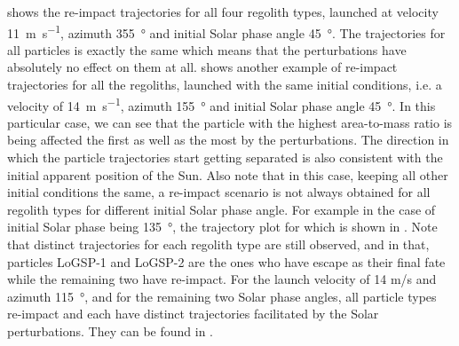  shows the re-impact trajectories for all four regolith types, launched at velocity \SI{11}{\metre\per\second}, azimuth \SI{355}{\degree} and initial Solar phase angle \SI{45}{\degree}. The trajectories for all particles is exactly the same which means that the perturbations have absolutely no effect on them at all.  shows another example of re-impact trajectories for all the regoliths, launched with the same initial conditions, i.e. a velocity of \SI{14}{\metre\per\second}, azimuth \SI{155}{\degree} and initial Solar phase angle \SI{45}{\degree}. In this particular case, we can see that the particle with the highest area-to-mass ratio is being affected the first as well as the most by the perturbations. The direction in which the particle trajectories start getting separated is also consistent with the initial apparent position of the Sun. Also note that in this case, keeping all other initial conditions the same, a re-impact scenario is not always obtained for all regolith types for different initial Solar phase angle. For example in the case of initial Solar phase being \SI{135}{\degree}, the trajectory plot for which is shown in . Note that distinct trajectories for each regolith type are still observed, and in that, particles LoGSP-1 and LoGSP-2 are the ones who have escape as their final fate while the remaining two have re-impact. For the launch velocity of 14 m/s and azimuth \SI{115}{\degree}, and for the remaining two Solar phase angles, all particle types re-impact and each have distinct trajectories facilitated by the Solar perturbations. They can be found in .
